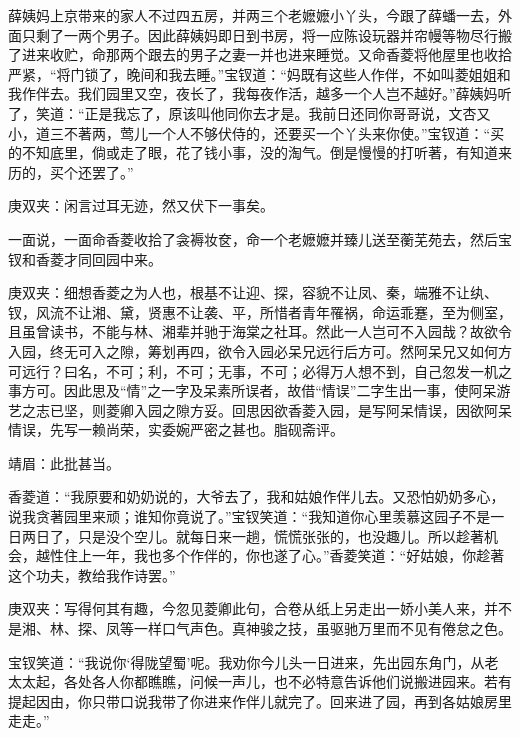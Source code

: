 \begin{parag}
    薛姨妈上京带来的家人不过四五房，并两三个老嬷嬷小丫头，今跟了薛蟠一去，外面只剩了一两个男子。因此薛姨妈即日到书房，将一应陈设玩器并帘幔等物尽行搬了进来收贮，命那两个跟去的男子之妻一并也进来睡觉。又命香菱将他屋里也收拾严紧，“将门锁了，晚间和我去睡。”宝钗道：“妈既有这些人作伴，不如叫菱姐姐和我作伴去。我们园里又空，夜长了，我每夜作活，越多一个人岂不越好。”薛姨妈听了，笑道：“正是我忘了，原该叫他同你去才是。我前日还同你哥哥说，文杏又小，道三不著两，莺儿一个人不够伏侍的，还要买一个丫头来你使。”宝钗道：“买的不知底里，倘或走了眼，花了钱小事，没的淘气。倒是慢慢的打听著，有知道来历的，买个还罢了。”\begin{note}庚双夹：闲言过耳无迹，然又伏下一事矣。\end{note}一面说，一面命香菱收拾了衾褥妆奁，命一个老嬷嬷并臻儿送至蘅芜苑去，然后宝钗和香菱才同回园中来。\begin{note}庚双夹：细想香菱之为人也，根基不让迎、探，容貌不让凤、秦，端雅不让纨、钗，风流不让湘、黛，贤惠不让袭、平，所惜者青年罹祸，命运乖蹇，至为侧室，且虽曾读书，不能与林、湘辈并驰于海棠之社耳。然此一人岂可不入园哉？故欲令入园，终无可入之隙，筹划再四，欲令入园必呆兄远行后方可。然阿呆兄又如何方可远行？曰名，不可；利，不可；无事，不可；必得万人想不到，自己忽发一机之事方可。因此思及“情”之一字及呆素所误者，故借“情误”二字生出一事，使阿呆游艺之志已坚，则菱卿入园之隙方妥。回思因欲香菱入园，是写阿呆情误，因欲阿呆情误，先写一赖尚荣，实委婉严密之甚也。脂砚斋评。\end{note}\begin{note}靖眉：此批甚当。\end{note}
\end{parag}


\begin{parag}
    香菱道：“我原要和奶奶说的，大爷去了，我和姑娘作伴儿去。又恐怕奶奶多心，说我贪著园里来顽；谁知你竟说了。”宝钗笑道：“我知道你心里羡慕这园子不是一日两日了，只是没个空儿。就每日来一趟，慌慌张张的，也没趣儿。所以趁著机会，越性住上一年，我也多个作伴的，你也遂了心。”香菱笑道：“好姑娘，你趁著这个功夫，教给我作诗罢。”\begin{note}庚双夹：写得何其有趣，今忽见菱卿此句，合卷从纸上另走出一娇小美人来，并不是湘、林、探、凤等一样口气声色。真神骏之技，虽驱驰万里而不见有倦怠之色。\end{note}宝钗笑道：“我说你‘得陇望蜀’呢。我劝你今儿头一日进来，先出园东角门，从老太太起，各处各人你都瞧瞧，问候一声儿，也不必特意告诉他们说搬进园来。若有提起因由，你只带口说我带了你进来作伴儿就完了。回来进了园，再到各姑娘房里走走。”
\end{parag}



